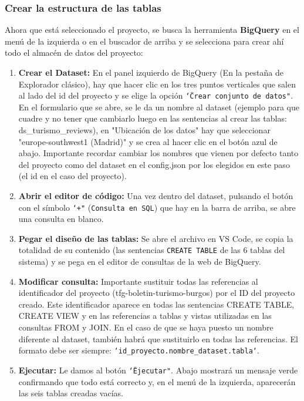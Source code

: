 \subsubsection{Crear la estructura de las tablas}
Ahora que está seleccionado el proyecto, se busca la herramienta \textbf{BigQuery} en el menú de la izquierda o en el buscador de arriba y se selecciona para crear ahí todo el almacén de datos del proyecto:
\begin{enumerate}
    \item \textbf{Crear el Dataset:} En el panel izquierdo de BigQuery (En la pestaña de Explorador clásico), hay que hacer clic en los tres puntos verticales que salen al lado del id del proyecto y se elige la opción \texttt{\char`\"Crear conjunto de datos"}. En el formulario que se abre, se le da un nombre al dataset (ejemplo para que cuadre y no tener que cambiarlo luego en las sentencias al crear las tablas: ds\_turismo\_reviews), en "Ubicación de los datos" hay que seleccionar "europe-southwest1 (Madrid)" y se crea al hacer clic en el botón azul de abajo. Importante recordar cambiar los nombres que vienen por defecto tanto del proyecto como del dataset en el config.json por los elegidos en este paso (el id en el caso del proyecto).
    \item \textbf{Abrir el editor de código:} Una vez dentro del dataset, pulsando el botón con el símbolo \texttt{\char`\"+"} (\texttt{Consulta en SQL}) que hay en la barra de arriba, se abre una consulta en blanco.
    \item \textbf{Pegar el diseño de las tablas:} Se abre el archivo  en VS Code, se copia la totalidad de su contenido (las sentencias \texttt{CREATE TABLE} de las 6 tablas del sistema) y se pega en el editor de consultas de la web de BigQuery.
    \item \textbf{Modificar consulta:} Importante sustituir todas las referencias al identificador del proyecto (tfg-boletin-turismo-burgos) por el ID del proyecto creado. Este identificador aparece en todas las sentencias CREATE TABLE, CREATE VIEW y en las referencias a tablas y vistas utilizadas en las consultas FROM y JOIN. En el caso de que se haya puesto un nombre diferente al dataset, también habrá que sustituirlo en todas las referencias. El formato debe ser siempre: \texttt{`id\_proyecto.nombre\_dataset.tabla`}.
    \item \textbf{Ejecutar:} Le damos al botón \texttt{\char`\"Ejecutar"}. Abajo mostrará un mensaje verde confirmando que todo está correcto y, en el menú de la izquierda, aparecerán las seis tablas creadas vacías.
\end{enumerate}

